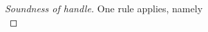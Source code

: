 \begin{proof}[Soundness of handle]
{   
   {
%
%
%
   }
   {
%
%
}
}
%
{One rule applies, namely \\
%
%
%
%
%
%
}

\end{proof}


